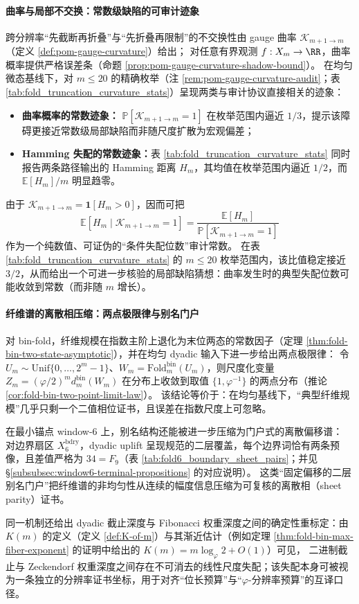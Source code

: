 \paragraph{曲率与局部不交换：常数级缺陷的可审计迹象}
跨分辨率“先截断再折叠”与“先折叠再限制”的不交换性由 gauge 曲率
\(\mathcal{K}_{m+1\to m}\)（定义 \ref{def:pom-gauge-curvature}）给出；
对任意有界观测 \(f:X_m\to\RR\)，曲率概率提供严格误差条（命题 \ref{prop:pom-gauge-curvature-shadow-bound}）。
在均匀微态基线下，对 \(m\le 20\) 的精确枚举（注 \ref{rem:pom-gauge-curvature-audit}；表 \ref{tab:fold_truncation_curvature_stats}）呈现两类与审计协议直接相关的迹象：
\begin{itemize}
  \item \textbf{曲率概率的常数迹象：} \(\mathbb{P}[\mathcal{K}_{m+1\to m}=1]\) 在枚举范围内逼近 \(1/3\)，提示该障碍更接近常数级局部缺陷而非随尺度扩散为宏观偏差；
  \item \textbf{Hamming 失配的常数迹象：}表 \ref{tab:fold_truncation_curvature_stats} 同时报告两条路径输出的 Hamming 距离 \(H_m\)，其均值在枚举范围内逼近 \(1/2\)，而 \(\mathbb{E}[H_m]/m\) 明显趋零。
\end{itemize}
由于 \(\mathcal{K}_{m+1\to m}=\mathbf 1[H_m>0]\)，因而可把
\[
\mathbb{E}[H_m\mid \mathcal{K}_{m+1\to m}=1]
=\frac{\mathbb{E}[H_m]}{\mathbb{P}[\mathcal{K}_{m+1\to m}=1]}
\]
作为一个纯数值、可证伪的“条件失配位数”审计常数。
在表 \ref{tab:fold_truncation_curvature_stats} 的 \(m\le 20\) 枚举范围内，该比值稳定接近 \(3/2\)，从而给出一个可进一步核验的局部缺陷猜想：曲率发生时的典型失配位数可能收敛到常数（而非随 \(m\) 增长）。

\paragraph{纤维谱的离散相压缩：两点极限律与别名门户}
对 bin-fold，纤维规模在指数主阶上退化为末位两态的常数因子（定理 \ref{thm:fold-bin-two-state-asymptotic}），并在均匀 dyadic 输入下进一步给出两点极限律：
令 \(U_m\sim\mathrm{Unif}\{0,\dots,2^m-1\}\)、\(W_m=\mathrm{Fold}^{\mathrm{bin}}_m(U_m)\)，则尺度化变量
\(
Z_m=(\varphi/2)^m d^{\mathrm{bin}}_m(W_m)
\)
在分布上收敛到取值 \(\{1,\varphi^{-1}\}\) 的两点分布（推论 \ref{cor:fold-bin-two-point-limit-law}）。
该结论等价于：在均匀基线下，“典型纤维规模”几乎只剩一个二值相位证书，且误差在指数尺度上可忽略。
\par
在最小锚点 window-\(6\) 上，别名结构还能被进一步压缩为门户式的离散偏移谱：
对边界扇区 \(X_6^{\mathrm{bdry}}\)，dyadic uplift 呈现规范的二层覆盖，每个边界词恰有两条预像，且差值严格为 \(34=F_9\)（表 \ref{tab:fold6_boundary_sheet_pairs}；并见 \S\ref{subsubsec:window6-terminal-propositions} 的对应说明）。
这类“固定偏移的二层别名门户”把纤维谱的非均匀性从连续的幅度信息压缩为可复核的离散相（sheet parity）证书。
\par
同一机制还给出 dyadic 截止深度与 Fibonacci 权重深度之间的确定性重标定：由 \(K(m)\) 的定义（定义 \ref{def:K-of-m}）与其渐近估计（例如定理 \ref{thm:fold-bin-max-fiber-exponent} 的证明中给出的 \(K(m)=m\log_\varphi 2+O(1)\)）可见，
二进制截止与 Zeckendorf 权重深度之间存在不可消去的线性尺度失配；该失配本身可被视为一条独立的分辨率证书坐标，用于对齐“位长预算”与“\(\varphi\)-分辨率预算”的互译口径。


